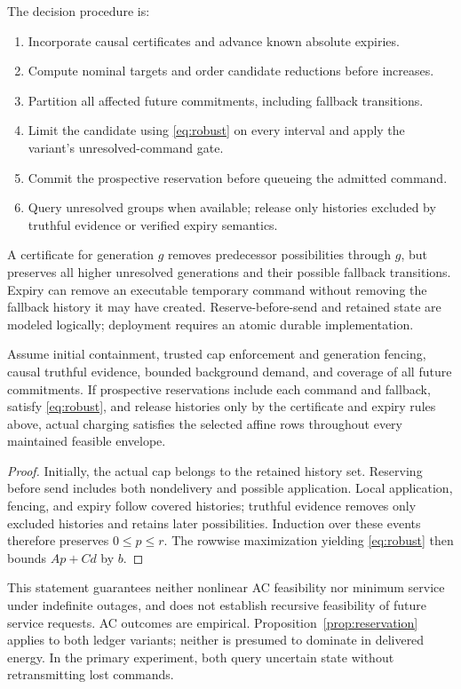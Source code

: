 The decision procedure is:
\begin{enumerate}
\setlength{\itemsep}{0pt}
\setlength{\parskip}{0pt}
\item Incorporate causal certificates and advance known absolute expiries.
\item Compute nominal targets and order candidate reductions before increases.
\item Partition all affected future commitments, including fallback transitions.
\item Limit the candidate using \eqref{eq:robust} on every interval and apply the
variant's unresolved-command gate.
\item Commit the prospective reservation before queueing the admitted command.
\item Query unresolved groups when available; release only histories excluded by
truthful evidence or verified expiry semantics.
\end{enumerate}

A certificate for generation $g$ removes predecessor possibilities through $g$,
but preserves all higher unresolved generations and their possible fallback
transitions. Expiry can remove an executable temporary command without removing
the fallback history it may have created. Reserve-before-send and retained state
are modeled logically; deployment requires an atomic durable implementation.

\begin{proposition}
\label{prop:reservation}
Assume initial containment, trusted cap enforcement and generation fencing,
causal truthful evidence, bounded background demand, and coverage of all future
commitments. If prospective reservations include each command and fallback,
satisfy \eqref{eq:robust}, and release histories only by the certificate and
expiry rules above, actual charging satisfies the selected affine rows
throughout every maintained feasible envelope.
\end{proposition}
\begin{proof}
Initially, the actual cap belongs to the retained history set. Reserving before
send includes both nondelivery and possible application. Local application,
fencing, and expiry follow covered histories; truthful evidence removes only
excluded histories and retains later possibilities. Induction over these events
therefore preserves $0\le p\le r$. The rowwise maximization yielding
\eqref{eq:robust} then bounds $Ap+Cd$ by $b$.
\end{proof}

This statement guarantees neither nonlinear AC feasibility nor minimum service
under indefinite outages, and does not establish recursive feasibility of future
service requests. AC outcomes are empirical. Proposition~\ref{prop:reservation}
applies to both ledger variants; neither is presumed to dominate in delivered
energy. In the primary experiment, both query uncertain state without
retransmitting lost commands.
